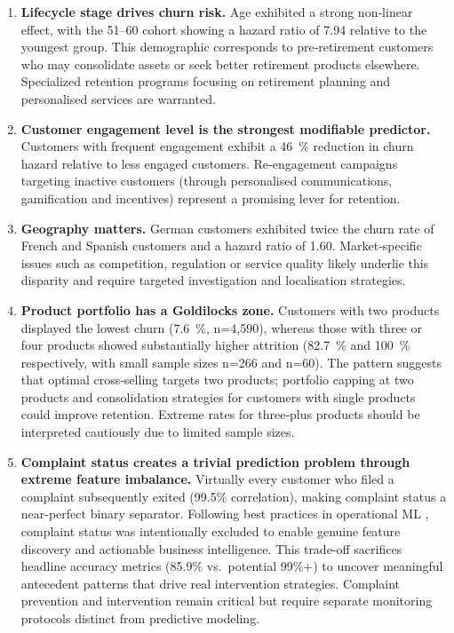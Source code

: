 \documentclass[12pt]{article}
\begin{document}
\begin{enumerate}
  \item \textbf{Lifecycle stage drives churn risk.}  Age exhibited a strong non‑linear effect, with the 51–60 cohort showing a hazard ratio of 7.94 relative to the youngest group.  This demographic corresponds to pre‑retirement customers who may consolidate assets or seek better retirement products elsewhere.  Specialized retention programs focusing on retirement planning and personalised services are warranted.

  \item \textbf{Customer engagement level is the strongest modifiable predictor.}  Customers with frequent engagement exhibit a 46~\% reduction in churn hazard relative to less engaged customers.  Re‑engagement campaigns targeting inactive customers (through personalised communications, gamification and incentives) represent a promising lever for retention.

  \item \textbf{Geography matters.}  German customers exhibited twice the churn rate of French and Spanish customers and a hazard ratio of 1.60.  Market‑specific issues such as competition, regulation or service quality likely underlie this disparity and require targeted investigation and localisation strategies.

  \item \textbf{Product portfolio has a Goldilocks zone.}  Customers with two products displayed the lowest churn (7.6~\%, n=4,590), whereas those with three or four products showed substantially higher attrition (82.7~\% and 100~\% respectively, with small sample sizes n=266 and n=60).  The pattern suggests that optimal cross‑selling targets two products; portfolio capping at two products and consolidation strategies for customers with single products could improve retention.  Extreme rates for three‑plus products should be interpreted cautiously due to limited sample sizes.

  \item \textbf{Complaint status creates a trivial prediction problem through extreme feature imbalance.}  Virtually every customer who filed a complaint subsequently exited (99.5\% correlation), making complaint status a near-perfect binary separator.  Following best practices in operational ML \citep{kumar2022customerretention}, complaint status was intentionally excluded to enable genuine feature discovery and actionable business intelligence.  This trade-off sacrifices headline accuracy metrics (85.9\% vs.\ potential 99\%+) to uncover meaningful antecedent patterns that drive real intervention strategies.  Complaint prevention and intervention remain critical but require separate monitoring protocols distinct from predictive modeling.
\end{enumerate}
\end{document}
